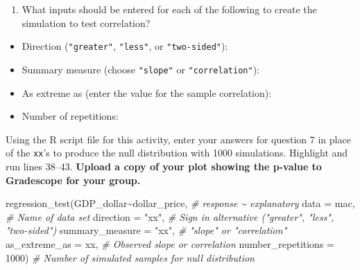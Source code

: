 \documentclass[
]{report}
\newenvironment{Shaded}{\begin{snugshade}}{\end{snugshade}}
\newcommand{\AttributeTok}[1]{\textcolor[rgb]{0.77,0.63,0.00}{#1}}
\newcommand{\CommentTok}[1]{\textcolor[rgb]{0.56,0.35,0.01}{\textit{#1}}}
\newcommand{\DecValTok}[1]{\textcolor[rgb]{0.00,0.00,0.81}{#1}}
\newcommand{\FunctionTok}[1]{\textcolor[rgb]{0.00,0.00,0.00}{#1}}
\newcommand{\NormalTok}[1]{#1}
\newcommand{\SpecialCharTok}[1]{\textcolor[rgb]{0.00,0.00,0.00}{#1}}
\newcommand{\StringTok}[1]{\textcolor[rgb]{0.31,0.60,0.02}{#1}}
\providecommand{\tightlist}{%
  \setlength{\itemsep}{0pt}\setlength{\parskip}{0pt}}
\begin{document}
\begin{enumerate}
\def\labelenumi{\arabic{enumi}.}
\setcounter{enumi}{6}
\tightlist
\item
  What inputs should be entered for each of the following to create the simulation to test correlation?
\end{enumerate}

\vspace{.5 mm}

\begin{itemize}
\tightlist
\item
  Direction (\texttt{"greater"}, \texttt{"less"}, or \texttt{"two-sided"}):
\end{itemize}

\vspace{.2in}

\begin{itemize}
\tightlist
\item
  Summary measure (choose \texttt{"slope"} or \texttt{"correlation"}):
\end{itemize}

\vspace{.2in}

\begin{itemize}
\tightlist
\item
  As extreme as (enter the value for the sample correlation):
\end{itemize}

\vspace{0.2in}

\begin{itemize}
\tightlist
\item
  Number of repetitions:
\end{itemize}

\vspace{.2in}

Using the R script file for this activity, enter your answers for question 7 in place of the \texttt{xx}'s to produce the null distribution with 1000 simulations. Highlight and run lines 38--43. \textbf{Upload a copy of your plot showing the p-value to Gradescope for your group.}

\begin{Shaded}
\begin{Highlighting}[]
\FunctionTok{regression\_test}\NormalTok{(GDP\_dollar}\SpecialCharTok{\textasciitilde{}}\NormalTok{dollar\_price, }\CommentTok{\# response \textasciitilde{} explanatory}
               \AttributeTok{data =}\NormalTok{ mac, }\CommentTok{\# Name of data set}
               \AttributeTok{direction =} \StringTok{"xx"}\NormalTok{, }\CommentTok{\# Sign in alternative ("greater", "less", "two{-}sided")}
               \AttributeTok{summary\_measure  =} \StringTok{"xx"}\NormalTok{, }\CommentTok{\# "slope" or "correlation"}
               \AttributeTok{as\_extreme\_as =}\NormalTok{ xx, }\CommentTok{\# Observed slope or correlation}
               \AttributeTok{number\_repetitions =} \DecValTok{1000}\NormalTok{) }\CommentTok{\# Number of simulated samples for null distribution}
\end{Highlighting}
\end{Shaded}
\end{document}
